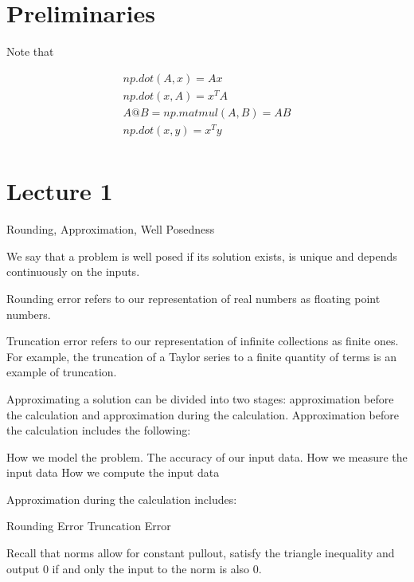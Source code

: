 \documentclass[../main.tex]{subfiles}
\begin{document}
\section{Preliminaries}
Note that

\begin{align*}
    np.dot(A,x) = Ax \\
    np.dot(x,A) = x^TA \\
    A @ B = np.matmul(A,B) = AB \\
    np.dot(x,y) = x^Ty \\
\end{align*}


\section{Lecture 1}{Rounding, Approximation, Well Posedness}

\begin{definition}
    We say that a problem is well posed if its solution exists, is unique and depends continuously on the inputs.
\end{definition}

\begin{definition}
    Rounding error refers to our representation of real numbers as floating point numbers.
\end{definition}

\begin{definition}
    Truncation error refers to our representation of infinite collections as finite ones. For example, the truncation of a Taylor
    series to a finite quantity of terms is an example of truncation.
\end{definition}

\begin{definition}
    Approximating a solution can be divided into two stages: approximation before the calculation and approximation during the calculation. Approximation before the calculation includes the following:

    \begin{outline}
        \1 How we model the problem.
        \1 The accuracy of our input data.
        \2 How we measure the input data
        \2 How we compute the input data
    \end{outline}

    Approximation during the calculation includes:

    \begin{outline}
        \1 Rounding Error
        \1 Truncation Error
    \end{outline}

    \begin{remark}
        Recall that norms allow for constant pullout, satisfy the triangle inequality and output $0$ if and only the input to the
        norm is also $0$.
    \end{remark}

\end{definition}
\end{document}
